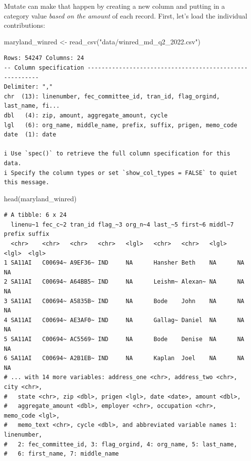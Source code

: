 \documentclass[
  letterpaper,
  DIV=11,
  numbers=noendperiod]{scrreprt}
\newenvironment{Shaded}{\begin{snugshade}}{\end{snugshade}}
\newcommand{\FunctionTok}[1]{\textcolor[rgb]{0.28,0.35,0.67}{#1}}
\newcommand{\NormalTok}[1]{\textcolor[rgb]{0.00,0.23,0.31}{#1}}
\newcommand{\OtherTok}[1]{\textcolor[rgb]{0.00,0.23,0.31}{#1}}
\newcommand{\StringTok}[1]{\textcolor[rgb]{0.13,0.47,0.30}{#1}}
\begin{document}
Mutate can make that happen by creating a new column and putting in a
category value \emph{based on the amount} of each record. First, let's
load the individual contributions:

\begin{Shaded}
\begin{Highlighting}[]
\NormalTok{maryland\_winred }\OtherTok{\textless{}{-}} \FunctionTok{read\_csv}\NormalTok{(}\StringTok{"data/winred\_md\_q2\_2022.csv"}\NormalTok{)}
\end{Highlighting}
\end{Shaded}

\begin{verbatim}
Rows: 54247 Columns: 24
-- Column specification --------------------------------------------------------
Delimiter: ","
chr  (13): linenumber, fec_committee_id, tran_id, flag_orgind, last_name, fi...
dbl   (4): zip, amount, aggregate_amount, cycle
lgl   (6): org_name, middle_name, prefix, suffix, prigen, memo_code
date  (1): date

i Use `spec()` to retrieve the full column specification for this data.
i Specify the column types or set `show_col_types = FALSE` to quiet this message.
\end{verbatim}

\begin{Shaded}
\begin{Highlighting}[]
\FunctionTok{head}\NormalTok{(maryland\_winred)}
\end{Highlighting}
\end{Shaded}

\begin{verbatim}
# A tibble: 6 x 24
  linenu~1 fec_c~2 tran_id flag_~3 org_n~4 last_~5 first~6 middl~7 prefix suffix
  <chr>    <chr>   <chr>   <chr>   <lgl>   <chr>   <chr>   <lgl>   <lgl>  <lgl> 
1 SA11AI   C00694~ A9EF36~ IND     NA      Hansher Beth    NA      NA     NA    
2 SA11AI   C00694~ A64BB5~ IND     NA      Leishm~ Alexan~ NA      NA     NA    
3 SA11AI   C00694~ A5835B~ IND     NA      Bode    John    NA      NA     NA    
4 SA11AI   C00694~ AE3AF0~ IND     NA      Gallag~ Daniel  NA      NA     NA    
5 SA11AI   C00694~ AC5569~ IND     NA      Bode    Denise  NA      NA     NA    
6 SA11AI   C00694~ A2B1EB~ IND     NA      Kaplan  Joel    NA      NA     NA    
# ... with 14 more variables: address_one <chr>, address_two <chr>, city <chr>,
#   state <chr>, zip <dbl>, prigen <lgl>, date <date>, amount <dbl>,
#   aggregate_amount <dbl>, employer <chr>, occupation <chr>, memo_code <lgl>,
#   memo_text <chr>, cycle <dbl>, and abbreviated variable names 1: linenumber,
#   2: fec_committee_id, 3: flag_orgind, 4: org_name, 5: last_name,
#   6: first_name, 7: middle_name
\end{verbatim}
\end{document}
